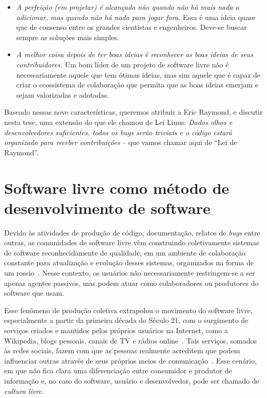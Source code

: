 \begin{itemize}
\item \emph{A perfeição (em projetar) é alcançada não quando não há mais nada a adicionar, 
	mas quando não há nada para jogar fora.} Essa é uma ideia quase que de consenso entre os grandes
	cientistas e engenheiros. Deve-se buscar sempre as soluções mais simples.

\item \emph{A melhor coisa depois de ter boas ideias é reconhecer as boas ideias de seus contribuidores.} 
    Um bom líder de um projeto de software livre não é necessariamente
    aquele que tem ótimas ideias, mas sim aquele que é capaz de criar o ecossistema de 
    colaboração que permita que as boas ideias emerjam e sejam valorizadas e adotadas.

\end{itemize}

Baseado nessas nove características, queremos atribuir a Eric Raymond, e 
discutir nesta tese, uma extensão do que ele chamou de Lei Linus:
\textit{Dados olhos e desenvolvedores suficientes, todos os bugs serão triviais e 
o código estará organizado para receber contribuições} -- que vamos chamar aqui
de ``Lei de Raymond''.


\section{Software livre como método de desenvolvimento de software}

Devido às atividades de produção de código, documentação, relatos de \textit{bugs}
entre outras, as comunidades de software livre vêm construindo coletivamente
sistemas de software reconhecidamente de qualidade, em
um ambiente de colaboração constante para atualização e evolução desses
sistemas, organizados na forma de um rossio~\citep{simon:08}.
Nesse contexto, os usuários não necessariamente restringem-se a ser apenas
agentes passivos, mas podem atuar como colaboradores ou produtores do software
que usam.

Esse fenômeno de produção coletiva extrapolou o movimento do software
livre, especialmente a partir da primeira década do Século 21, com o surgimento de 
serviços criados e mantidos pelos próprios usuários na Internet, como a
Wikipedia, blogs pessoais, canais de TV e rádios online~\citep{wikinomics}.
%
Tais serviços, somados às redes
sociais, fazem com que as pessoas realmente
acreditem que podem influenciar outras através de seus próprios meios de
comunicação~\citep{castells:06}.
%
Esse cenário, em que não fica clara uma diferenciação entre consumidor e produtor de
informação e, no caso do software, usuário e desenvolvedor, pode ser chamado de
\emph{cultura livre}.

